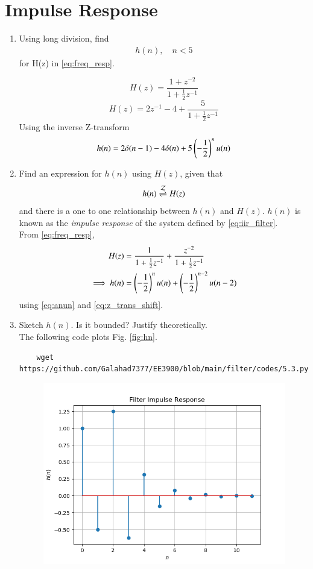 \documentclass[journal,12pt,twocolumn]{IEEEtran}
\renewcommand\thesection{\arabic{section}}
\begin{document}
\section{Impulse Response}
\begin{enumerate}[label=\thesection.\arabic*]
	\item Using long division, 
find
		\begin{align}
			h(n), \quad n < 5
		\end{align}
		for H(z) in 
		\eqref{eq:freq_resp}.

\solution
\[ H(z) = \frac{1 + z^{-2}}{1 + \frac{1}{2}z^{-1}} \]
\[ H(z) = 2z^{-1} - 4 + \frac{5}{1 + \frac{1}{2}z^{-1}} \]
Using the inverse Z-transform
\[ h(n) = 2\delta(n-1) - 4\delta(n) + 5\left(-\frac{1}{2}\right)^n u(n)\]
\item \label{prob:impulse_resp}
Find an expression for $h(n)$ using $H(z)$, given that 
\begin{equation}
\label{eq:impulse_resp}
h(n) \overset{\mathcal{Z}}{ \rightleftharpoons} H(z)
\end{equation}
and there is a one to one relationship between $h(n)$ and $H(z)$. $h(n)$ is known as the {\em impulse response} of the
system defined by \eqref{eq:iir_filter}.
\\
\solution From \eqref{eq:freq_resp},
\begin{align}
H(z) &= \frac{1}{1 + \frac{1}{2}z^{-1}} + \frac{ z^{-2}}{1 + \frac{1}{2}z^{-1}}
\\
\implies h(n) &= \left(-\frac{1}{2}\right)^{n}u(n) + \left(-\frac{1}{2}\right)^{n-2}u(n-2)
\end{align}
using \eqref{eq:anun} and \eqref{eq:z_trans_shift}.
\item Sketch $h(n)$. Is it bounded? Justify theoretically.
\\
\solution The following code plots Fig. \ref{fig:hn}.
\begin{lstlisting}
    wget https://github.com/Galahad7377/EE3900/blob/main/filter/codes/5.3.py
\end{lstlisting}
\begin{figure}[ht]
\centering
\includegraphics[width=\columnwidth]{figs/5.3.png}

\end{figure}
\end{enumerate}
\end{document}
